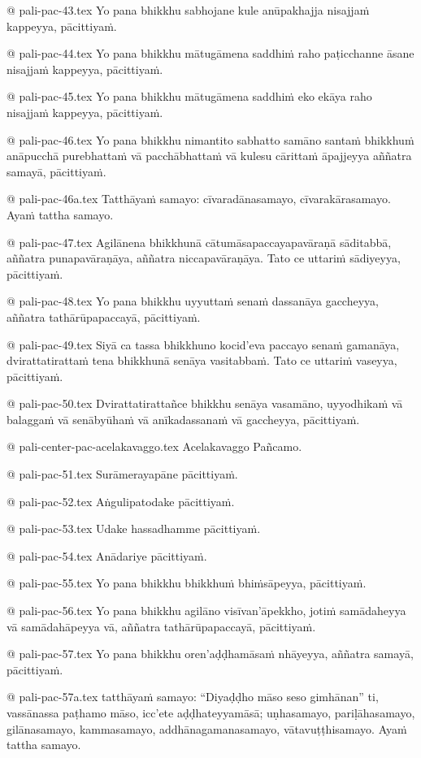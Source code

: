 @ pali-pac-43.tex
Yo pana bhikkhu sabhojane kule anūpakhajja nisajjaṁ kappeyya, pācittiyaṁ.

@ pali-pac-44.tex
Yo pana bhikkhu mātugāmena saddhiṁ raho paṭicchanne āsane nisajjaṁ kappeyya, pācittiyaṁ.

@ pali-pac-45.tex
Yo pana bhikkhu mātugāmena saddhiṁ eko ekāya raho nisajjaṁ kappeyya, pācittiyaṁ.

@ pali-pac-46.tex
Yo pana bhikkhu nimantito sabhatto samāno santaṁ bhikkhuṁ anāpucchā purebhattaṁ vā pacchābhattaṁ vā kulesu cārittaṁ āpajjeyya aññatra samayā, pācittiyaṁ.

@ pali-pac-46a.tex
Tatthāyaṁ samayo: cīvaradānasamayo, cīvarakārasamayo. Ayaṁ tattha samayo.

@ pali-pac-47.tex
Agilānena bhikkhunā cātumāsapaccayapavāraṇā sāditabbā, aññatra punapavāraṇāya, aññatra niccapavāraṇāya. Tato ce uttariṁ sādiyeyya, pācittiyaṁ.

@ pali-pac-48.tex
Yo pana bhikkhu uyyuttaṁ senaṁ dassanāya gaccheyya, aññatra tathārūpapaccayā, pācittiyaṁ.

@ pali-pac-49.tex
Siyā ca tassa bhikkhuno kocid’eva paccayo senaṁ gamanāya, dvirattatirattaṁ tena bhikkhunā senāya vasitabbaṁ. Tato ce uttariṁ vaseyya, pācittiyaṁ.

@ pali-pac-50.tex
Dvirattatirattañce bhikkhu senāya vasamāno, uyyodhikaṁ vā balaggaṁ vā senābyūhaṁ vā anīkadassanaṁ vā gaccheyya, pācittiyaṁ.

@ pali-center-pac-acelakavaggo.tex
Acelakavaggo Pañcamo.

@ pali-pac-51.tex
Surāmerayapāne pācittiyaṁ.

@ pali-pac-52.tex
Aṅgulipatodake pācittiyaṁ.

@ pali-pac-53.tex
Udake hassadhamme pācittiyaṁ.

@ pali-pac-54.tex
Anādariye pācittiyaṁ.

@ pali-pac-55.tex
Yo pana bhikkhu bhikkhuṁ bhiṁsāpeyya, pācittiyaṁ.

@ pali-pac-56.tex
Yo pana bhikkhu agilāno visīvan’āpekkho, jotiṁ samādaheyya vā samādahāpeyya vā, aññatra tathārūpapaccayā, pācittiyaṁ.

@ pali-pac-57.tex
Yo pana bhikkhu oren’aḍḍhamāsaṁ nhāyeyya, aññatra samayā, pācittiyaṁ.

@ pali-pac-57a.tex
tatthāyaṁ samayo: “Diyaḍḍho māso seso gimhānan” ti, vassānassa paṭhamo māso, icc’ete aḍḍhateyyamāsā; uṇhasamayo, pariḷāhasamayo, gilānasamayo, kammasamayo, addhānagamanasamayo, vātavuṭṭhisamayo. Ayaṁ tattha samayo.

